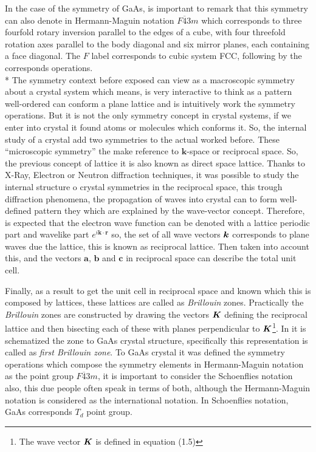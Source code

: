In the case of the symmetry of GaAs, is important to remark that this symmetry can also denote in Hermann-Maguin notation  $F\overline{4}3m$ which corresponds to three fourfold rotary inversion parallel to the edges of a cube, with four threefold rotation axes parallel to the body diagonal and six mirror planes, each containing a face diagonal\cite{chatterjee2008crystallography}. The $F$ label corresponds to cubic system FCC, following by the corresponds operations.  \\*
The symmetry context before exposed can view as a macroscopic symmetry about  a crystal system  which means, is very interactive to think as a pattern well-ordered can conform a plane lattice and is intuitively work the symmetry operations. But it is not  the only  symmetry concept in crystal systems, if  we enter into crystal it found atoms or molecules which conforms it. So, the internal study of a crystal add two symmetries to the actual worked before. These ``microscopic symmetry''\cite{chatterjee2008crystallography} the make reference to $\boldsymbol{k}$-space or reciprocal space.  So, the previous concept of lattice it is also known as direct space lattice.
Thanks to X-Ray, Electron or Neutron diffraction techniques, it was possible to study the internal structure o crystal symmetries in the reciprocal space, this trough diffraction phenomena, the propagation of waves into crystal can to form well-defined pattern they which are explained by the wave-vector concept\cite{malgrange2014symmetry,powell2010symmetry}. Therefore, is expected  that the electron wave function can be denoted with a lattice periodic part  and wavelike part $e^{i\boldsymbol{k}\cdotp\boldsymbol{r}}$ so, the set of all wave vectors $\boldsymbol k$ corresponds to plane waves due the lattice, this is known as reciprocal lattice\cite{ashcroft1976solid}.  
Then taken into account this, and  the vectors $\mathbf{a}$, $\mathbf{b}$ and $\mathbf{c}$ in reciprocal space can describe the total unit cell\cite{ashcroft1976solid,powell2010symmetry}. 

Finally, as a result to get the unit cell in reciprocal space and known which this is composed by lattices, these lattices are called as \emph{Brillouin} zones. Practically the \emph{Brillouin} zones are constructed by drawing the vectors $\boldsymbol K$ defining the reciprocal lattice and then bisecting each of these with planes perpendicular to  $\boldsymbol K$\cite{powell2010symmetry}\footnote{The wave vector  $\boldsymbol K$ is defined in\cite{powell2010chapter1} equation (1.5)}. In  it is schematized the \brill zone to GaAs crystal structure, specifically this representation is called as \emph{ first Brillouin zone}.
To GaAs crystal it was defined the symmetry operations which compose the symmetry elements in Hermann-Maguin notation as the  point group  $F\overline{4}3m$, it is important to consider the Schoenflies notation also,  this due people often speak in terms of both, although the Hermann-Maguin notation is considered as the international notation. In Schoenflies notation, GaAs corresponds $T_{d}$ point group. 

